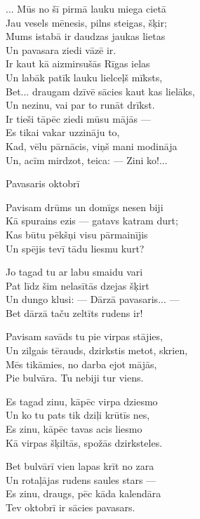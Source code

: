 \documentclass[14pt]{extarticle}
\begin{document}
{{... Mūs no šī pirmā lauku miega cietā\\
Jau vesels mēnesis, pilns steigas, šķir;\\
Mums istabā ir daudzas jaukas lietas\\
Un pavasara ziedi vāzē ir.\\
Ir kaut kā aizmirsušās Rīgas ielas\\
Un labāk patīk lauku lielceļš mīksts,\\
Bet... draugam dzīvē sācies kaut kas lielāks,\\
Un nezinu, vai par to runāt drīkst.\\
Ir tieši tāpēc ziedi mūsu mājās ---\\
Es tikai vakar uzzināju to,\\
Kad, vēlu pārnācis, viņš mani modināja\\
Un, acīm mirdzot, teica: --- Zini ko!...



\newpage

{\large \sc Pavasaris oktobrī}

Pavisam drūms un domīgs nesen biji\\
Kā spurains ezis --- gatavs katram durt;\\
Kas būtu pēkšņi visu pārmainījis\\
Un spējis tevī tādu liesmu kurt?

Jo tagad tu ar labu smaidu vari\\
Pat līdz šim nelasītās dzejas šķirt\\
Un dungo klusi: --- Dārzā pavasaris... ---\\
Bet dārzā taču zeltīts rudens ir!

Pavisam savāds tu pie virpas stājies,\\
Un zilgais tērauds, dzirkstis metot, skrien,\\
Mēs tikāmies, no darba ejot mājās,\\
Pie bulvāra. Tu nebiji tur viens.

Es tagad zinu, kāpēc virpa dziesmo\\
Un ko tu pats tik dziļi krūtīs nes,\\
Es zinu, kāpēc tavas acis liesmo\\
Kā virpas šķiltās, spožās dzirksteles.

Bet bulvārī vien lapas krīt no zara\\
Un rotaļājas rudens saules stars ---\\
Es zinu, draugs, pēc kāda kalendāra\\
Tev oktobrī ir sācies pavasars.

}}
\end{document}
